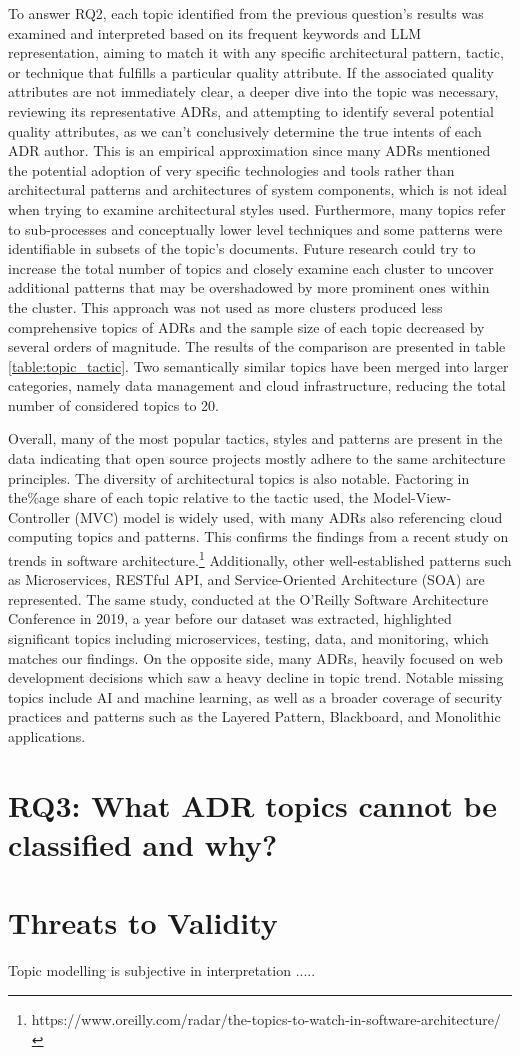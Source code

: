         To answer RQ2, each topic identified from the previous question's results was examined and interpreted based on its frequent keywords and LLM representation, aiming to match it with any specific architectural pattern, tactic, or technique that fulfills a particular quality attribute. If the associated quality attributes are not immediately clear, a deeper dive into the topic was necessary, reviewing its representative ADRs, and attempting to identify several potential quality attributes, as we can't conclusively determine the true intents of each ADR author. This is an empirical approximation since many ADRs mentioned the potential adoption of very specific technologies and tools rather than architectural patterns and architectures of system components, which is not ideal when trying to examine architectural styles used. Furthermore, many topics refer to sub-processes and conceptually lower level techniques and some patterns were identifiable in subsets of the topic's documents. Future research could try to increase the total number of topics and closely examine each cluster to uncover additional patterns that may be overshadowed by more prominent ones within the cluster. This approach was not used as more clusters produced less comprehensive topics of ADRs and the sample size of each topic decreased by several orders of magnitude. The results of the comparison are presented in table \ref{table:topic_tactic}. Two semantically similar topics have been merged into larger categories, namely data management and cloud infrastructure, reducing the total number of considered topics to 20.

        

        Overall, many of the most popular tactics, styles and patterns are present in the data indicating that open source projects mostly adhere to the same architecture principles. The diversity of architectural topics is also notable. Factoring in the\%age share of each topic relative to the tactic used, the Model-View-Controller (MVC) model is widely used, with many ADRs also referencing cloud computing topics and patterns. This confirms the findings from a recent study on trends in software architecture.\footnote{https://www.oreilly.com/radar/the-topics-to-watch-in-software-architecture/} Additionally, other well-established patterns such as Microservices, RESTful API, and Service-Oriented Architecture (SOA) are represented. The same study, conducted at the O’Reilly Software Architecture Conference in 2019, a year before our dataset was extracted, highlighted significant topics including microservices, testing, data, and monitoring, which matches our findings. On the opposite side, many ADRs, heavily focused on web development decisions which saw a heavy decline in topic trend. Notable missing topics include AI and machine learning, as well as a broader coverage of security practices and patterns such as the Layered Pattern, Blackboard, and Monolithic applications.
        
    \section{RQ3: What ADR topics cannot be classified and why?}
        

        
    \section{Threats to Validity}
    Topic modelling is subjective in interpretation ..... 
